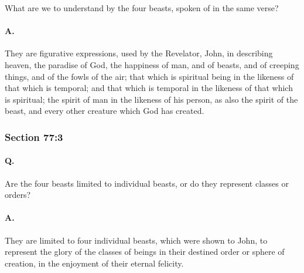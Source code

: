 			What are we to understand by the four beasts, spoken of in the same verse?

		\paragraph{A.}
		
			They are figurative expressions, used by the Revelator, John, in describing heaven, the paradise of God, the happiness of man, and of beasts, and of creeping things, and of the fowls of the air; that which is spiritual being in the likeness of that which is temporal; and that which is temporal in the likeness of that which is spiritual; the spirit of man in the likeness of his person, as also the spirit of the beast, and every other creature which God has created.


	\subsubsection{Section 77:3} %
		\label{DC77-3}

		\paragraph{Q.}

			Are the four beasts limited to individual beasts, or do they represent classes or orders?

		\paragraph{A.}
		
			They are limited to four individual beasts, which were shown to John, to represent the glory of the classes of beings in their destined order or sphere of creation, in the enjoyment of their eternal felicity.


